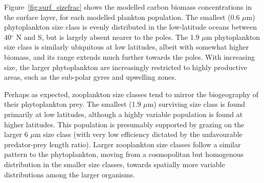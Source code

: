 \documentclass[gmd, manuscript]{copernicus}
\begin{document}
{Figure~\ref{fig:surf_sizefrac} shows the modelled carbon biomass concentrations in the surface layer, for each modelled plankton population. The smallest (0.6 $\mu$m) phytoplankton size class is evenly distributed in the low-latitude oceans between 40$^\circ$ N and S, but is largely absent nearer to the poles. The 1.9 $\mu$m phytoplankton size class is similarly ubiquitous at low latitudes, albeit with somewhat higher biomass, and its range extends much further towards the poles. With increasing size, the larger phytoplankton are increasingly restricted to highly productive areas, such as the sub-polar gyres and upwelling zones. 

Perhaps as expected, zooplankton size classes tend to mirror the biogeography of their phytoplankton prey. The smallest (1.9 $\mu$m) surviving size class is found primarily at low latitudes, although a highly variable population is found at higher latitudes. This population is presumably supported by grazing on the larger 6 $\mu$m size class (with very low efficiency dictated by the unfavourable predator-prey length ratio). Larger zooplankton size classes follow a similar pattern to the phytoplankton, moving from a cosmopolitan but homogenous distribution in the smaller size classes, towards spatially more variable distributions among the larger organisms.

}
\end{document}
